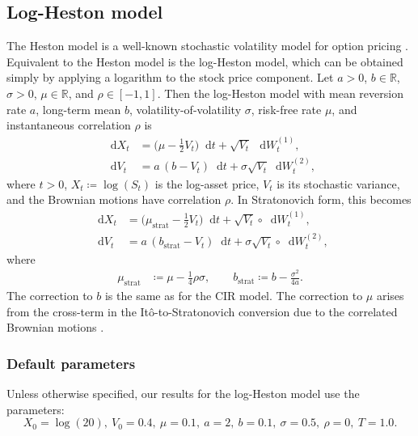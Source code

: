 \documentclass[11pt, letterpaper]{article}
\theoremstyle{definition}
\theoremstyle{remark}
\newcommand{\R}{\mathbb{R}}
\newcommand{\diff}{\mathop{}\!\mathrm{d}}
\begin{document}
\begin{appendices}
\subsection{Log-Heston model}\label{app:heston}
The Heston model is a well-known stochastic volatility model for option pricing \cite{heston1993}. Equivalent to the Heston model is the log-Heston model, which can be obtained simply by applying a logarithm to the stock price component. Let $a>0$, $b\in\R$, $\sigma>0$, $\mu\in\R$, and $\rho\in[-1,1]$. Then the log-Heston model with mean reversion rate $a$, long-term mean $b$, volatility-of-volatility $\sigma$, risk-free rate $\mu$, and instantaneous correlation $\rho$ is
\begin{equation}\label{eq:heston_ito}
\begin{aligned}
    \diff X_t &= \bigl(\mu - \tfrac{1}{2}V_t\bigr) \diff t + \sqrt{V_t}\, \diff W^{(1)}_t,\\
    \diff V_t &= a\,(b - V_t)\diff t + \sigma \sqrt{V_t} \diff W^{(2)}_t,
\end{aligned}
\end{equation}\medbreak
where $t>0$, $X_t \coloneqq \log {(S_t)}$ is the log-asset price, $V_t$ is its stochastic variance, and the Brownian motions have correlation $\rho$.
In Stratonovich form, this becomes
\begin{equation}\label{eq:heston_strat}
\begin{aligned}
    \diff X_t &= \bigl(\mu_{\text{strat}} - \tfrac{1}{2}V_t\bigr) \diff t + \sqrt{V_t}\circ \diff W^{(1)}_t,\\
    \diff V_t &= a\,(b_{\text{strat}} - V_t) \diff t + \sigma \sqrt{V_t}\circ \diff W^{(2)}_t,
\end{aligned}
\end{equation}
where
\begin{align*}
\mu_{\text{strat}} &\coloneqq \mu - \tfrac{1}{4}\rho\sigma,\qquad b_{\text{strat}} \coloneqq b - \tfrac{\sigma^2}{4a}.
\end{align*}
The correction to $b$ is the same as for the CIR model. The correction to $\mu$ arises from the cross-term in the It\^{o}-to-Stratonovich conversion due to the correlated Brownian motions \cite{KP1992}.

\subsubsection*{Default parameters}
Unless otherwise specified, our results for the log-Heston model use the parameters:
\[X_{0}=\log(20),\ V_0=0.4,\ \mu=0.1,\ a=2,\ b=0.1,\ \sigma=0.5,\ \rho=0,\ T = 1.0.\]


\end{appendices}
\end{document}
